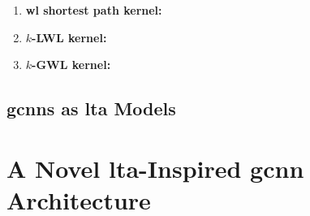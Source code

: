 \begin{enumerate}[label=\textbf{\arabic*.}]
		Via the decomposition and multiplicity functions that were just described, $\varphi_{\text{ST}}$ is in fact an \ac{sce} with a nontrivial, subtree-based decomposition function.
		By \cref{thm:ltag:svm-ltag-formulation} \acp{svm} that use the \ac{wl} subtree kernel therefore have nontrivial \ac{lta} formulations, i.e.\ they can be considered to be ``\ac{lta}-like'' models.
		However, unlike fingerprint embeddings, the \ac{wl} subtree constituents are not manually chosen to be interpretable.
		This implies that the localized explainability characteristic of \ac{lta} is only partially satisfied since the \ac{svm} predictions are based on local constituent predictions that are not necessarily interpretable.
	\item \textbf{\ac{wl} shortest path kernel:}
	\item \textbf{$k$-LWL kernel:}
	\item \textbf{$k$-GWL kernel:}
\end{enumerate}

\subsection{\acsp*{gcnn} as \acs*{lta} Models}%
\label{sec:ltag:formulation:gcnn}

\section{A Novel \acs*{lta}-Inspired \acs*{gcnn} Architecture}%
\label{sec:ltag:wl2gnn}
